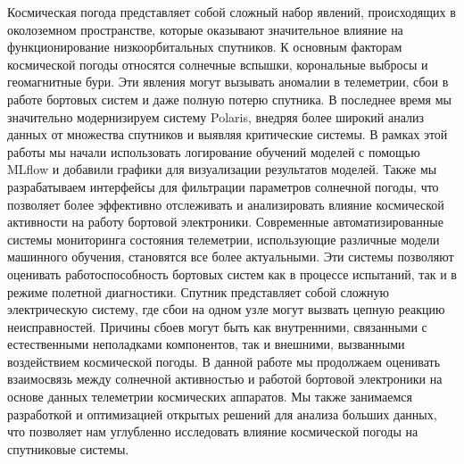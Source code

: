 
Космическая погода представляет собой сложный набор явлений, происходящих в
околоземном пространстве, которые оказывают значительное влияние на
функционирование низкоорбитальных спутников. К основным факторам космической
погоды относятся солнечные вспышки, корональные выбросы и геомагнитные бури.
Эти явления могут вызывать аномалии в телеметрии, сбои в работе бортовых систем
и даже полную потерю спутника. В последнее время мы значительно модернизируем
систему Polaris, внедряя более широкий анализ данных от множества спутников и
выявляя критические системы. В рамках этой работы мы начали использовать
логирование обучений моделей с помощью MLflow и добавили графики для
визуализации результатов моделей. Также мы разрабатываем интерфейсы для
фильтрации параметров солнечной погоды, что позволяет более эффективно
отслеживать и анализировать влияние космической активности на работу бортовой
электроники. Современные автоматизированные системы мониторинга состояния
телеметрии, использующие различные модели машинного обучения, становятся все
более актуальными. Эти системы позволяют оценивать работоспособность бортовых
систем как в процессе испытаний, так и в режиме полетной диагностики. Спутник
представляет собой сложную электрическую систему, где сбои на одном узле могут
вызвать цепную реакцию неисправностей. Причины сбоев могут быть как
внутренними, связанными с естественными неполадками компонентов, так и
внешними, вызванными воздействием космической погоды. В данной работе мы
продолжаем оценивать взаимосвязь между солнечной активностью и работой бортовой
электроники на основе данных телеметрии космических аппаратов. Мы также
занимаемся разработкой и оптимизацией открытых решений для анализа больших
данных, что позволяет нам углубленно исследовать влияние космической погоды на
спутниковые системы.
